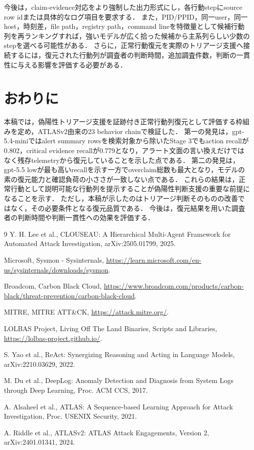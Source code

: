 \documentclass[a4paper,twocolumn,10pt]{article}
\newcommand{\code}[1]{{\small\ttfamily #1}}
\begin{document}
今後は，claim-evidence対応をより強制した出力形式にし，各行動stepにsource row idまたは具体的なログ項目を要求する．
また，PID/PPID，同一user，同一host，時刻差，file path，registry path，command lineを特徴量として候補行動列を再ランキングすれば，強いモデルが広く拾った候補から主系列らしい少数のstepを選べる可能性がある．
さらに，正常行動復元を実際のトリアージ支援へ接続するには，復元された行動列が調査者の判断時間，追加調査件数，判断の一貫性に与える影響を評価する必要がある．

\section{おわりに}

本稿では，偽陽性トリアージ支援を証跡付き正常行動列復元として評価する枠組みを定め，ATLASv2由来の23 behavior chain\cite{atlasv2}で検証した．
第一の発見は，\code{gpt-5.4-mini}ではalert summary rowsを検索対象から除いたStage 3でもaction recallが0.802，critical evidence recallが0.779となり，アラート文面の言い換えだけではなく残存telemetryから復元していることを示した点である．
第二の発見は，\code{gpt-5.5 low}が最も高いrecallを示す一方でoverclaim総数も最大となり，モデルの素の復元能力と確認負荷の小ささが一致しない点である．
これらの結果は，正常行動として説明可能な行動列を提示することが偽陽性判断支援の重要な前提になることを示す．
ただし，本稿が示したのはトリアージ判断そのものの改善ではなく，その必要条件となる復元品質である．
今後は，復元結果を用いた調査者の判断時間や判断一貫性への効果を評価する．

\begin{thebibliography}{9}
Y. H. Lee et al., CLOUSEAU: A Hierarchical Multi-Agent Framework for Automated Attack Investigation, arXiv:2505.01799, 2025.

Microsoft, Sysmon - Sysinternals, \url{https://learn.microsoft.com/en-us/sysinternals/downloads/sysmon}.

Broadcom, Carbon Black Cloud, \url{https://www.broadcom.com/products/carbon-black/threat-prevention/carbon-black-cloud}.

MITRE, MITRE ATT\&CK, \url{https://attack.mitre.org/}.

LOLBAS Project, Living Off The Land Binaries, Scripts and Libraries, \url{https://lolbas-project.github.io/}.

S. Yao et al., ReAct: Synergizing Reasoning and Acting in Language Models, arXiv:2210.03629, 2022.

M. Du et al., DeepLog: Anomaly Detection and Diagnosis from System Logs through Deep Learning, Proc. ACM CCS, 2017.

A. Alsaheel et al., ATLAS: A Sequence-based Learning Approach for Attack Investigation, Proc. USENIX Security, 2021.

A. Riddle et al., ATLASv2: ATLAS Attack Engagements, Version 2, arXiv:2401.01341, 2024.
\end{thebibliography}
\end{document}
